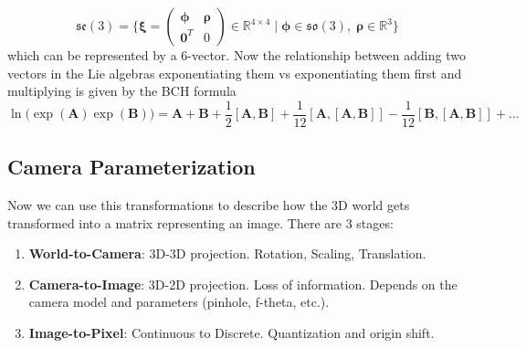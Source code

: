 \documentclass{article}
\begin{document}
  \begin{equation}
    \mathfrak{se}(3) = \bigg\{ \boldsymbol{\xi} = \begin{pmatrix} \boldsymbol{\phi} & \boldsymbol{\rho} \\ \mathbf{0}^T & 0 \end{pmatrix} \in \mathbb{R}^{4 \times 4} \; \bigg| \; \boldsymbol{\phi} \in \mathfrak{so}(3), \; \boldsymbol{\rho} \in \mathbb{R}^3 \bigg\}
  \end{equation}
  which can be represented by a $6$-vector. Now the relationship between adding two vectors in the Lie algebras exponentiating them vs exponentiating them first and multiplying is given by the BCH formula 
  \begin{equation}
    \ln\big( \exp(\mathbf{A}) \exp(\mathbf{B}) \big) = \mathbf{A} + \mathbf{B} + \frac{1}{2} [ \mathbf{A}, \mathbf{B}] + \frac{1}{12} [ \mathbf{A}, [\mathbf{A}, \mathbf{B}]] - \frac{1}{12} [\mathbf{B}, [\mathbf{A}, \mathbf{B}]] + \ldots
  \end{equation}

  \subsection{Camera Parameterization}

  Now we can use this transformations to describe how the 3D world gets transformed into a matrix representing an image. There are 3 stages: 
  \begin{enumerate}
      \item \textbf{World-to-Camera}: 3D-3D projection. Rotation, Scaling, Translation. 
      \item \textbf{Camera-to-Image}: 3D-2D projection. Loss of information. Depends on the camera model and parameters (pinhole, f-theta, etc.). 
      \item \textbf{Image-to-Pixel}: Continuous to Discrete. Quantization and origin shift. 
  \end{enumerate}
\end{document}
